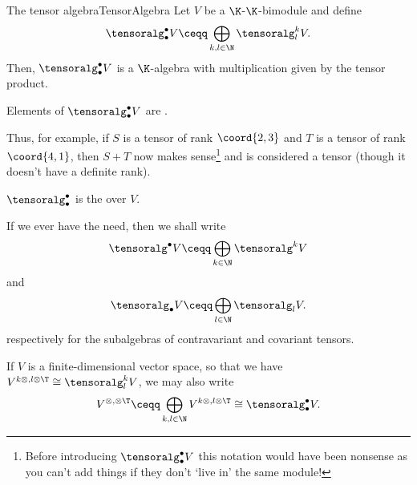 \begin{thm}{The tensor algebra}{TensorAlgebra}
	Let $V$ be a $\K$-$\K$-bimodule and define
	\begin{equation}
		\tensoralg _{\bullet}^{\bullet}V\ceqq \bigoplus _{k,l\in \N}\tensoralg _l^kV.
	\end{equation}\index[notation]{$\tensoralg _{\bullet}^{\bullet}$} 
	Then, $\tensoralg _{\bullet}^{\bullet}V$ is a $\K$-algebra with multiplication given by the tensor product.
	\begin{rmk}
		Elements of $\tensoralg _{\bullet}^{\bullet}V$ are .
		
		Thus, for example, if $S$ is a tensor of rank $\coord{2,3}$ and $T$ is a tensor of rank $\coord{4,1}$, then $S+T$ now makes sense\footnote{Before introducing $\tensoralg _{\bullet}^{\bullet}V$ this notation would have been nonsense as you can't add things if they don't `live in' the same module!} and is considered a tensor (though it doesn't have a definite rank).
	\end{rmk}
	\begin{rmk}
		$\tensoralg _{\bullet}^{\bullet}$ is the  over $V$.
	\end{rmk}
	\begin{rmk}	
		If we ever have the need, then we shall write
		\begin{equation}
			\tensoralg ^{\bullet}V\ceqq \bigoplus _{k\in \N}\tensoralg ^kV
		\end{equation}\index[notation]{$\tensoralg ^{\bullet}V$}
		and
		\begin{equation}
			\tensoralg _{\bullet}V\ceqq \bigoplus _{l\in \N}\tensoralg _lV.
		\end{equation}\index[notation]{$\tensoralg _{\bullet}V$}
		respectively for the subalgebras of contravariant and covariant tensors.
	\end{rmk}
	\begin{rmk}
		If $V$ is a finite-dimensional vector space, so that we have $V^{k\otimes ,l\otimes \T}\cong \tensoralg _l^kV$, we may also write
		\begin{equation}
			V^{\otimes ,\otimes \T}\ceqq \bigoplus _{k,l\in \N}V^{k\otimes ,l\otimes \T}\cong \tensoralg _{\bullet}^{\bullet}V.
		\end{equation}\index[notation]{$V^{\otimes ,\otimes \T}$}
		

\end{rmk}
\end{thm}
